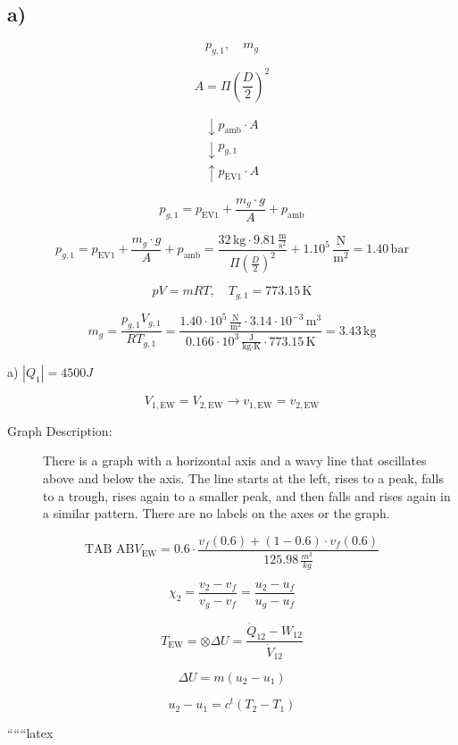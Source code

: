 

\subsection*{a)}

\[
p_{g,1}, \quad m_g
\]

\[
A = \Pi \left( \frac{D}{2} \right)^2
\]

\[
\begin{array}{c}
\downarrow p_{\text{amb}} \cdot A \\
\downarrow p_{g,1} \\
\uparrow p_{\text{EV1}} \cdot A
\end{array}
\]

\[
p_{g,1} = p_{\text{EV1}} + \frac{m_g \cdot g}{A} + p_{\text{amb}}
\]

\[
p_{g,1} = p_{\text{EV1}} + \frac{m_g \cdot g}{A} + p_{\text{amb}} = \frac{32 \, \text{kg} \cdot 9.81 \, \frac{\text{m}}{\text{s}^2}}{\Pi \left( \frac{D}{2} \right)^2} + 1.10^5 \, \frac{\text{N}}{\text{m}^2} = \boxed{1.40 \, \text{bar}}
\]

\[
pV = mRT, \quad T_{g,1} = 773.15 \, \text{K}
\]

\[
m_g = \frac{p_{g,1} V_{g,1}}{R T_{g,1}} = \frac{1.40 \cdot 10^5 \, \frac{\text{N}}{\text{m}^2} \cdot 3.14 \cdot 10^{-3} \, \text{m}^3}{0.166 \cdot 10^3 \, \frac{\text{J}}{\text{kg} \cdot \text{K}} \cdot 773.15 \, \text{K}} = 3.43 \, \text{kg}
\]

a) \(\left|Q_1\right| = 4500 J\)

\[ V_{1, \text{EW}} = V_{2, \text{EW}} \rightarrow v_{1, \text{EW}} = v_{2, \text{EW}} \]

\begin{description}
    \item[Graph Description:] 
    There is a graph with a horizontal axis and a wavy line that oscillates above and below the axis. The line starts at the left, rises to a peak, falls to a trough, rises again to a smaller peak, and then falls and rises again in a similar pattern. There are no labels on the axes or the graph.
\end{description}

\[ \text{TAB AB} V_{\text{EW}} = 0.6 \cdot \frac{v_f(0.6) + (1-0.6) \cdot v_f(0.6)}{125.98 \, \frac{m^3}{kg}} \]

\[ \chi_2 = \frac{v_2 - v_f}{v_g - v_f} = \frac{u_2 - u_f}{u_g - u_f} \]

\[ T_{\text{EW}} = \otimes \Delta U = \frac{\dot{Q}_{12} - W_{12}}{\dot{V}_{12}} \]

\[ \Delta U = m(u_2 - u_1) \]

\[ u_2 - u_1 = c^t(T_2 - T_1) \]

``````latex